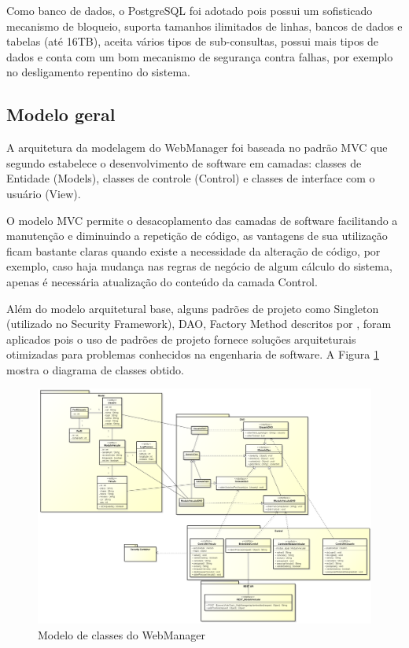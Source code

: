 Como banco de dados, o PostgreSQL foi adotado  pois possui um sofisticado mecanismo de bloqueio, suporta tamanhos ilimitados de linhas, bancos de dados e tabelas (até 16TB), aceita vários tipos de sub-consultas, possui mais tipos de dados e conta com um bom mecanismo de segurança contra falhas, por exemplo no desligamento repentino do sistema.

\subsection{Modelo geral}

A arquitetura da modelagem do WebManager foi baseada no padrão MVC que segundo \textcite{Mendes:2002} estabelece o desenvolvimento de software em camadas: classes de Entidade (Models), classes de controle (Control) e classes de interface com o usuário (View). 

O modelo MVC permite o desacoplamento das camadas de software facilitando a manutenção e diminuindo a repetição de código, as vantagens de sua utilização ficam bastante claras quando existe a necessidade da alteração de código, por exemplo, caso haja mudança nas regras de negócio de algum cálculo do sistema, apenas é necessária atualização do conteúdo da camada Control.

Além do modelo arquitetural base, alguns padrões de projeto como Singleton (utilizado no Security Framework), DAO, Factory Method descritos por \textcite{Gamma:2000}, foram aplicados pois o uso de padrões de projeto fornece soluções arquiteturais otimizadas para problemas conhecidos na engenharia de software. A Figura \ref{fig:classgeralwebman} mostra o diagrama de classes obtido.

\begin{landscape}

\begin{figure}[!htb]
	\centering
	\includegraphics[width=20.00cm\textwidth]{figures/6_web_manager.png}
	\caption{Modelo de classes do WebManager}
	\label{fig:classgeralwebman}
\end{figure}
\end{landscape}

